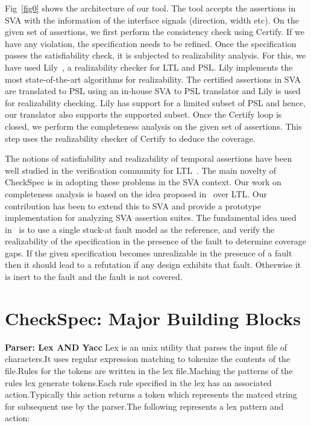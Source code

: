 \documentclass{svmult}
\begin{document}
\noindent
Fig~\ref{fig0} shows the architecture of our tool. The
tool accepts the assertions in SVA with the information 
of the interface signals (direction, width etc).
On the given set of assertions, we first perform the consistency check 
using Certify. If we have any violation, the specification needs 
to be refined. Once the specification passes the satisfiability check, it is 
subjected to realizability analysis. For this, we have
used Lily~\cite{lily}, a realizability checker for LTL and PSL.
Lily implements the most state-of-the-art algorithms for realizability.
The certified assertions in SVA are translated to PSL using an in-house 
{SVA to PSL translator} and Lily is used for realizability checking. 
Lily has support for a limited subset of PSL 
and hence, our translator also supports the supported subset. 
Once the Certify loop is closed, we perform the 
completeness analysis on the given set of assertions.
This step uses the realizability checker of Certify 
to deduce the coverage. 

The notions of satisfiability and realizability of temporal assertions 
have been well studied in the verification community for 
LTL~\cite{roadmap}. The main novelty of CheckSpec is in 
adopting these problems in the SVA context. Our work on completeness 
analysis is based on the idea proposed in~\cite{das:05} over LTL. Our 
contribution has been to extend this to SVA and provide a prototype 
implementation for analyzing SVA assertion suites. The fundamental idea 
used in~\cite{das:05} is to use a single stuck-at fault model as the 
reference, and verify the realizability of the specification in the presence 
of the fault to determine coverage gaps. If the given specification
becomes unrealizable in the presence of a fault then it should lead to a 
refutation if any design exhibits that fault. Otherwise it is inert to the
fault and the fault is not covered. 

\section{CheckSpec: Major Building Blocks} \label{sec4}
\noindent
{\bf Parser: Lex AND Yacc} 
Lex is an unix utility that parses the input file of characters.It uses 
regular expression matching to tokenize the contents of the file.Rules 
for the tokens are written in the lex file.Maching the patterns of the 
rules lex generate tokens.Each rule specified in the lex has an associated
action.Typically this action returns a token which represents the matced string 
for subsequent use by the parser.The following represents a lex pattern and action:
\end{document}
